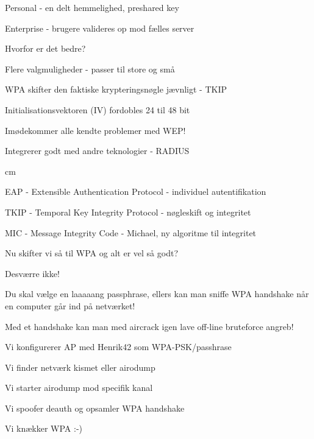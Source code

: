 \documentclass[Screen16to9,17pt]{foils}
\begin{document}
\begin{list1}
\item Personal - en delt hemmelighed, preshared key
\item Enterprise - brugere valideres op mod fælles server
\item Hvorfor er det bedre?
\begin{list2}
\item Flere valgmuligheder - passer til store og små
\item WPA skifter den faktiske krypteringsnøgle jævnligt - TKIP
\item Initialisationsvektoren (IV) fordobles 24 til 48 bit
\item Imødekommer alle kendte problemer med WEP!
\item Integrerer godt med andre teknologier - RADIUS

 cm
\item EAP - Extensible Authentication Protocol - individuel autentifikation
\item TKIP - Temporal Key Integrity Protocol - nøgleskift og integritet
\item MIC - Message Integrity Code - Michael, ny algoritme til integritet
\end{list2}

\end{list1}



\begin{list1}
\item Nu skifter vi så til WPA og alt er vel så godt?
\pause
\item Desværre ikke!
\item Du skal vælge en laaaaang passphrase, ellers kan man sniffe WPA
  handshake når en computer går ind på netværket!
\item Med et handshake kan man med aircrack igen lave off-line
  bruteforce angreb!
\end{list1}


\begin{list1}
\item Vi konfigurerer AP med Henrik42 som WPA-PSK/passhrase
\item Vi finder netværk kismet eller airodump
\item Vi starter airodump mod specifik kanal
\item Vi spoofer deauth og opsamler WPA handshake
\item Vi knækker WPA :-)
\end{list1}
\end{document}
